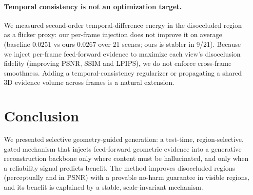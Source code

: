 \documentclass[10pt,twocolumn,letterpaper]{article}
\begin{document}
\paragraph{Temporal consistency is not an optimization target.} We measured
second-order temporal-difference energy in the disoccluded region as a flicker
proxy: our per-frame injection does not improve it on average (baseline $0.0251$
vs ours $0.0267$ over 21 scenes; ours is stabler in 9/21). Because we inject
per-frame feed-forward evidence to maximize each view's disocclusion fidelity
(improving PSNR, SSIM and LPIPS), we do not enforce cross-frame smoothness.
Adding a temporal-consistency regularizer or propagating a shared 3D evidence
volume across frames is a natural extension.

\section{Conclusion}
\label{sec:concl}
We presented selective geometry-guided generation: a test-time, region-selective,
gated mechanism that injects feed-forward geometric evidence into a generative
reconstruction backbone only where content must be hallucinated, and only when a
reliability signal predicts benefit. The method improves disoccluded regions
(perceptually and in PSNR) with a provable no-harm guarantee in visible regions,
and its benefit is explained by a stable, scale-invariant mechanism.

{\small

}
\end{document}
